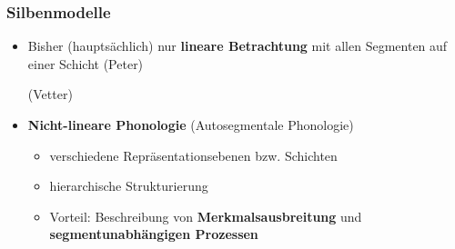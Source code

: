 \begin{frame}
\frametitle{Silbenmodelle}

\begin{itemize}
	\item Bisher (hauptsächlich) nur \textbf{lineare Betrachtung} mit allen Segmenten auf einer Schicht
	  \ea
           (Peter)
          \z
	
	  \ea
           (Vetter)
          \z

	\item \textbf{Nicht-lineare Phonologie} (Autosegmentale Phonologie)
	
	\begin{itemize}
		\item verschiedene Repräsentationsebenen bzw. Schichten
		
		\item hierarchische Strukturierung
		
		\item Vorteil: Beschreibung von \textbf{Merkmalsausbreitung} und \textbf{segmentunabhängigen Prozessen}
		
	\end{itemize}
\end{itemize}

\end{frame}






